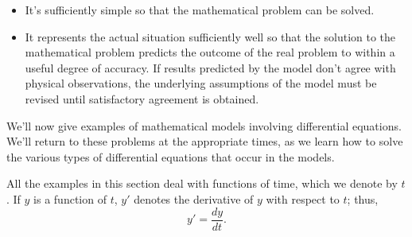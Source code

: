 \documentclass{ximera}
\begin{document}
\begin{itemize}
\item It's sufficiently simple so that the mathematical problem
can be solved.

\item It represents the actual situation sufficiently well so that the
solution to the mathematical problem predicts the outcome of the real
problem to within a useful degree of accuracy. If results predicted by
the model don't agree with physical observations, the
underlying
assumptions of the model must be revised until satisfactory agreement
is obtained.
\end{itemize}

We'll  now give  examples of mathematical models involving
differential equations. We'll return to these problems at the
appropriate times, as we learn how to solve the various types of
differential equations that occur in the models.

All the examples in this section deal with functions of time, which we
 denote by $t$. If $y$ is a function of $t$,  $y'$
denotes the derivative of $y$ with respect to $t$;   thus,
$$
y'=\frac{dy}{dt}.
$$


\end{document}
